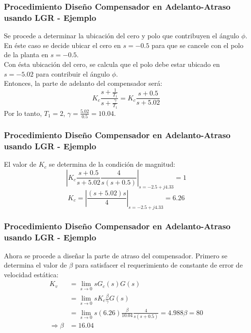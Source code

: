 \documentclass[aspectratio=169,handout]{beamer}
\theoremstyle{definition}
\theoremstyle{plain}
\theoremstyle{remark}
\begin{document}
\begin{frame}[<+->]\frametitle{Procedimiento Diseño Compensador en Adelanto-Atraso usando LGR - Ejemplo}
	Se procede a determinar la ubicación del cero y polo que contribuyen el ángulo $\phi$. En éste caso se decide ubicar el cero en $s=-0.5$ para que se cancele con el polo de la planta en $s = -0.5$.\\
	\vspace*{3mm}
	\pause
	Con ésta ubicación del cero, se calcula que el polo debe estar ubicado en $s = -5.02$ para contribuir el ángulo $\phi$.\\
	\vspace*{3mm}
	\pause
	Entonces, la parte de adelanto del compensador será:
	\begin{equation*}
		K_c\frac{s+\frac{1}{T_1}}{s+\frac{\gamma}{T_1}} = K_c\frac{s+0.5}{s+5.02}
	\end{equation*}
	\vspace*{3mm}
	\pause
	Por lo tanto, $T_1 = 2$, $\gamma = \frac{5.02}{0.5} = 10.04$.
\end{frame}

\begin{frame}[<+->]\frametitle{Procedimiento Diseño Compensador en Adelanto-Atraso usando LGR - Ejemplo}
	El valor de $K_c$ se determina de la condición de magnitud:
	\begin{equation*}
		\left| K_c \frac{s+0.5}{s+5.02} \frac{4}{s(s+0.5)} \right|_{s=-2.5+j4.33} = 1
	\end{equation*}
	\begin{equation*}
		K_c = \left| \frac{(s+5.02)s}{4} \right|_{s=-2.5+j4.33} = 6.26
	\end{equation*}
\end{frame}

\begin{frame}[<+->]\frametitle{Procedimiento Diseño Compensador en Adelanto-Atraso usando LGR - Ejemplo}
	Ahora se procede a diseñar la parte de atraso del compensador. Primero se determina el valor de $\beta$ para satisfacer el requerimiento de constante de error de velocidad estática:
	\begin{align*}
		K_v &= \lim_{s \rightarrow 0} sG_c(s)G(s)\\
		&= \lim_{s \rightarrow 0}s K_c \frac{\beta}{\gamma}G(s)\\
		&= \lim_{s \rightarrow 0} s (6.26) \frac{\beta}{10.04}\frac{4}{s(s+0.5)} = 4.988\beta = 80\\
		\Rightarrow \beta &= 16.04
	\end{align*}
\end{frame}
\end{document}
